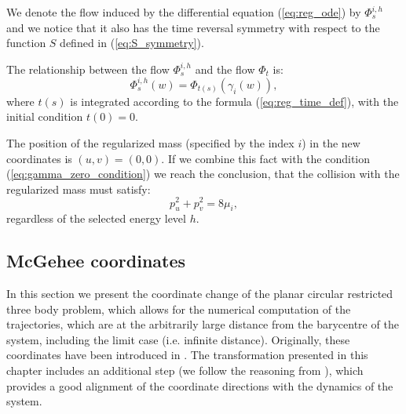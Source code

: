 \documentclass[1p]{article}
\begin{document}
We denote the flow induced by the differential equation (\ref{eq:reg_ode}) by $\Phi_s^{i,h}$ and we notice that it also has the time reversal symmetry with respect to the function $S$ defined in (\ref{eq:S_symmetry}).

The relationship between the flow $\Phi_s^{i,h}$ and the flow $\Phi_t$ is:
\[
    \Phi_{s}^{i,h} (w) = \Phi_{t(s)} (\gamma_i(w)),
\]
where $t(s)$ is integrated according to the formula (\ref{eq:reg_time_def}), with the initial condition $t(0) = 0$.

The position of the regularized mass (specified by the index $i$) in the new coordinates is $(u,v) = (0,0)$. If we combine this fact with the condition (\ref{eq:gamma_zero_condition}) we reach the conclusion, that the collision with the regularized mass must satisfy:
\begin{equation}
    p_{u}^{2}+p_{v}^{2}=8\mu_{i}, \label{eq:collision-circle}
\end{equation}
regardless of the selected energy level $h$.

\subsection{McGehee coordinates}
In this section we present the coordinate change of the planar circular restricted three body problem, which allows for the numerical computation of the trajectories, which are at the arbitrarily large distance from the barycentre of the system, including the limit case (i.e. infinite distance). Originally, these coordinates have been introduced in \cite{MCGEHEE197370}. The transformation presented in this chapter includes an additional step (we follow the reasoning from \cite{CAPINSKI2022316}), which provides a good alignment of the coordinate directions with the dynamics of the system.
\end{document}
